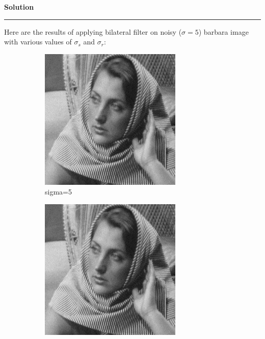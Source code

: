 \documentclass[a4paper,12pt]{article}
\newenvironment{solution}[2][]{%
    \begin{mdframed}[linecolor=green!60!black, linewidth=2pt, roundcorner=10pt, backgroundcolor=green!5!white, skipabove=12pt, skipbelow=12pt]%
        \textbf{\large #2} %
        \par\noindent\rule{\textwidth}{0.4pt} %
        \vspace{0.5em} %
}{%
    \end{mdframed}%
}
\begin{document}
\begin{solution}{Solution}
Here are the results of applying bilateral filter on noisy ($\sigma = 5$) barbara image with various values of $\sigma_s$ and $\sigma_r$:

\begin{figure}[H]
    \centering
    \begin{subfigure}[b]{0.24\textwidth}
        \centering
        \includegraphics[width=\textwidth]{../images/noisy_barbara256.png}
        \caption{sigma=5}
        \label{Noisy }
    \end{subfigure}
    \begin{subfigure}[b]{0.24\textwidth}
        \centering
        \includegraphics[width=\textwidth]{../images/filtered_barbara256_bilateral_sigma_s_2_sigma_r_2.png}

\end{subfigure}
\end{figure}
\end{solution}
\end{document}
